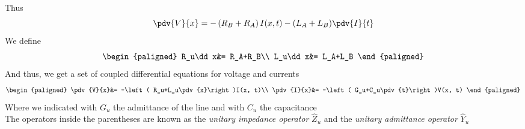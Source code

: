 \documentclass[../electromagnetism.tex]{subfiles}
\begin{document}
Thus
\begin{equation*}
	\pdv{V}{x}=-\left( R_B+R_A \right)I(x, t)-(L_A+L_B)\pdv{I}{t}
\end{equation*}
We define 
\begin{equation}
	\begin{paligned}
		R_u\dd x&= R_A+R_B\\
		L_u\dd x&= L_A+L_B
	\end{paligned}
	\label{eq:rulu.tra}
\end{equation}
And thus, we get a set of coupled differential equations for voltage and currents
\begin{equation}
	\begin{paligned}
		\pdv{V}{x}&= -\left( R_u+L_u\pdv{x}\right)I(x, t)\\
		\pdv{I}{x}&= -\left( G_u+C_u\pdv{t}\right)V(x, t)
	\end{paligned}
	\label{eq:teleq.tra}
\end{equation}
Where we indicated with $G_u$ the admittance of the line and with $C_u$ the capacitance\\
The operators inside the parentheses are known as the \textit{unitary impedance operator} $\hat{Z}_u$ and the \textit{unitary admittance operator} $\hat{Y}_u$
\end{document}
